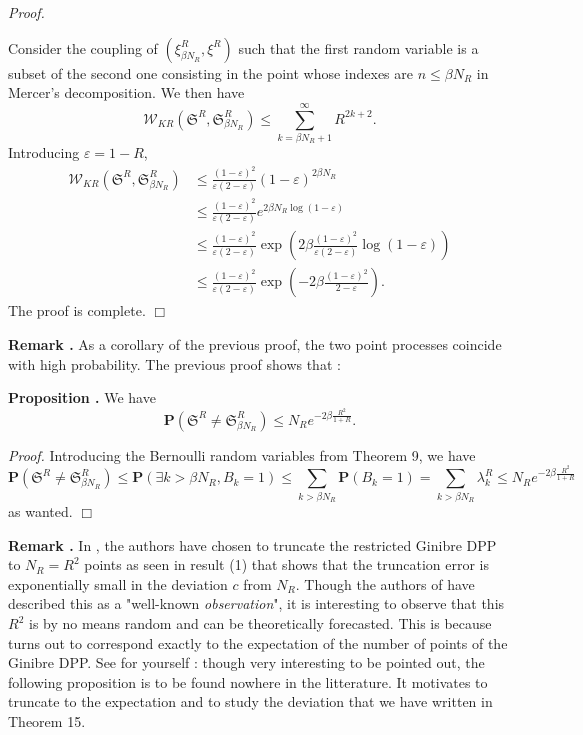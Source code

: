 \documentclass[11pt]{article}
\newcommand{\qed}{\hfill$\Box$}
\newcounter{cnt}
\newcommand{\cnt}{\thecnt \stepcounter{cnt}}
\begin{document}
\textit{Proof.}

Consider the coupling of $(\xi_{\beta N_R}^R, \xi^R)$ such that the first random variable is a subset of the second one consisting in the point whose indexes are $n \le \beta N_R$ in Mercer's decomposition. We then have
\[
\mathcal{W}_{KR}(\mathfrak{S}^R, \mathfrak{S}_{\beta N_R}^R) \leqslant \sum_{k=\beta N_R+1}^\infty R^{2k+2}.
\]
Introducing $\varepsilon = 1 - R$,
\begin{align*}
\mathcal{W}_{KR}(\mathfrak{S}^R, \mathfrak{S}_{\beta N_R}^R) &\leqslant \frac{(1-\varepsilon)^2}{\varepsilon(2-\varepsilon)} (1-\varepsilon)^{2\beta N_R} \\
&\leqslant \frac{(1-\varepsilon)^2}{\varepsilon(2-\varepsilon)} e^{2\beta N_R \log(1-\varepsilon)} \\
&\leqslant \frac{(1-\varepsilon)^2}{\varepsilon(2-\varepsilon)} \exp \left( 2\beta \frac{(1-\varepsilon)^2}{\varepsilon(2-\varepsilon)} \log(1-\varepsilon) \right) \\
&\leqslant \frac{(1-\varepsilon)^2}{\varepsilon(2-\varepsilon)} \exp \left( -2\beta \frac{(1-\varepsilon)^2}{2-\varepsilon} \right).
\end{align*}
The proof is complete. \qed

\textbf{Remark \cnt.} As a corollary of the previous proof, the two point processes coincide with high probability. The previous proof shows that :

\textbf{Proposition \cnt.} We have
\[
\mathbf{P}(\mathfrak{S}^R \neq \mathfrak{S}_{\beta N_R}^R) \leqslant N_R e^{-2\beta \frac{R^2}{1+R}}.
\]

\textit{Proof.}
Introducing the Bernoulli random variables from Theorem 9, we have
\[
\mathbf{P}(\mathfrak{S}^R \neq \mathfrak{S}_{\beta N_R}^R) \leqslant \mathbf{P}(\exists k > \beta N_R, B_k = 1) \leqslant \sum_{k > \beta N_R} \mathbf{P}(B_k = 1) = \sum_{k > \beta N_R} \lambda_k^R \leqslant N_R e^{-2\beta \frac{R^2}{1+R}}
\]
as wanted. \qed

\textbf{Remark \cnt.} In \cite{DecreusefondMoroz2021}, the authors have chosen to truncate the restricted Ginibre DPP to $N_R = R^2$ points as seen in result (1) that shows that the truncation error is exponentially small in the deviation $c$ from $N_R$. Though the authors of \cite{DecreusefondMoroz2021} have described this as a "well-known \textit{observation}", it is interesting to observe that this $R^2$ is by no means random and can be theoretically forecasted. This is because turns out to correspond exactly to the expectation of the number of points of the Ginibre DPP. See for yourself : though very interesting to be pointed out, the following proposition is to be found nowhere in the litterature. It motivates to truncate to the expectation and to study the deviation that we have written in Theorem 15.
\end{document}
